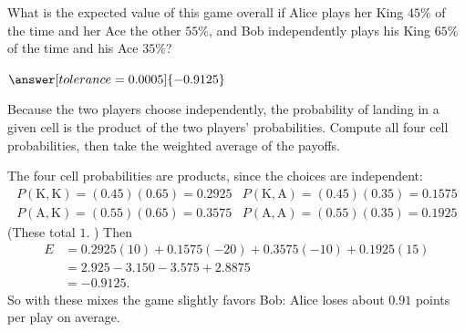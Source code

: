 \documentclass[12pt]{ximera}
\begin{document}
\begin{problem}
\begin{prompt}
What is the expected value of this game overall if Alice plays her King $45\%$ of the
time and her Ace the other $55\%$, and Bob independently plays his King $65\%$ of the
time and his Ace $35\%$?

$\answer[tolerance=0.0005]{-0.9125}$

\begin{hint}
Because the two players choose independently, the probability of landing in a given
cell is the product of the two players' probabilities. Compute all four cell
probabilities, then take the weighted average of the payoffs.
\end{hint}

\begin{feedback}
The four cell probabilities are products, since the choices are independent:
\[
\begin{array}{ll}
P(\text{K},\text{K})=(0.45)(0.65)=0.2925 & P(\text{K},\text{A})=(0.45)(0.35)=0.1575\\
P(\text{A},\text{K})=(0.55)(0.65)=0.3575 & P(\text{A},\text{A})=(0.55)(0.35)=0.1925
\end{array}
\]
(These total $1$. \checkmark) Then
\begin{align*}
E &= 0.2925(10) + 0.1575(-20) + 0.3575(-10) + 0.1925(15)\\
  &= 2.925 - 3.150 - 3.575 + 2.8875\\
  &= -0.9125.
\end{align*}
So with these mixes the game slightly favors Bob: Alice loses about $0.91$ points per
play on average.
\end{feedback}
\end{prompt}
\end{problem}
\end{document}
